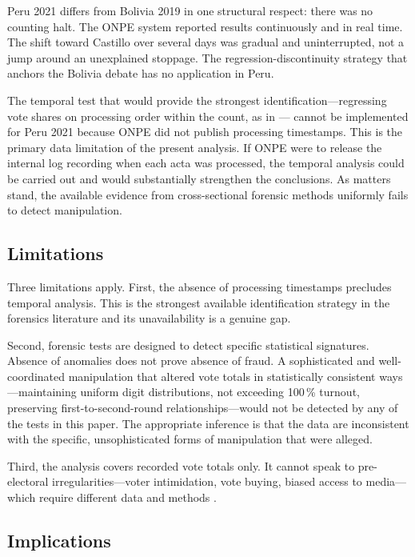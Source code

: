 \documentclass[12pt]{article}
\begin{document}
Peru 2021 differs from Bolivia 2019 in one structural respect: there was no
counting halt. The ONPE system reported results continuously and in real time.
The shift toward Castillo over several days was gradual and uninterrupted, not
a jump around an unexplained stoppage. The regression-discontinuity strategy
that anchors the Bolivia debate has no application in Peru.

The temporal test that would provide the strongest identification---regressing
vote shares on processing order within the count, as in \citet{escobari2024}---
cannot be implemented for Peru 2021 because ONPE did not publish processing
timestamps. This is the primary data limitation of the present analysis.
If ONPE were to release the internal log recording when each acta was
processed, the temporal analysis could be carried out and would substantially
strengthen the conclusions. As matters stand, the available evidence from
cross-sectional forensic methods uniformly fails to detect manipulation.

\subsection{Limitations}

Three limitations apply. First, the absence of processing timestamps precludes
temporal analysis. This is the strongest available identification strategy in
the forensics literature \citep{escobari2024} and its unavailability is a
genuine gap.

Second, forensic tests are designed to detect specific statistical signatures.
Absence of anomalies does not prove absence of fraud. A sophisticated and
well-coordinated manipulation that altered vote totals in statistically
consistent ways---maintaining uniform digit distributions, not exceeding 100\,\%
turnout, preserving first-to-second-round relationships---would not be detected
by any of the tests in this paper. The appropriate inference is that the
data are inconsistent with the specific, unsophisticated forms of manipulation
that were alleged.

Third, the analysis covers recorded vote totals only. It cannot speak to
pre-electoral irregularities---voter intimidation, vote buying, biased access
to media---which require different data and methods \citep{callen2015}.

\subsection{Implications}
\end{document}
